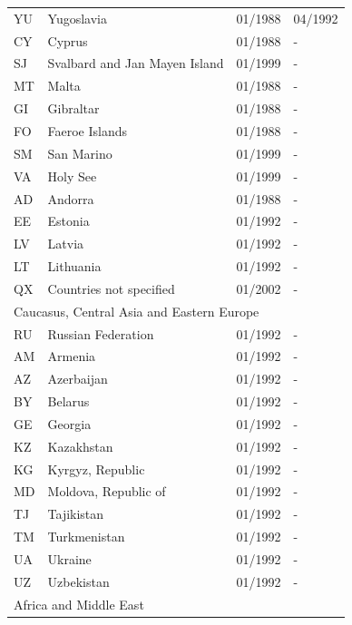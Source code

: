 \begin{footnotesize}
\begin{longtable}{lp{8cm}p{2cm}p{2cm}}
	YU   &   Yugoslavia                       &   01/1988   &   04/1992  \\
	CY   &   Cyprus                           &   01/1988   &   -  \\
	SJ   &   Svalbard and Jan Mayen Island    &   01/1999   &   -  \\
	MT   &   Malta                            &   01/1988   &   -  \\
	GI   &   Gibraltar                        &   01/1988   &   -  \\
	FO   &   Faeroe Islands                   &   01/1988   &   -  \\
	SM   &   San Marino                       &   01/1999   &   -  \\
	VA   &   Holy See                         &   01/1999   &   -  \\
	AD   &   Andorra                          &   01/1988   &   -  \\
	EE   &   Estonia                          &   01/1992   &   -  \\
	LV   &   Latvia                           &   01/1992   &   -  \\
	LT   &   Lithuania                        &   01/1992   &   -  \\
	QX   &   Countries not specified          &   01/2002   &   -  \\
  \midrule
  \multicolumn{3}{l}{Caucasus, Central Asia and Eastern Europe}  &  \\
	RU & Russian Federation   & 01/1992 & -  \\
	AM & Armenia              & 01/1992 & -  \\
	AZ & Azerbaijan           & 01/1992 & -  \\
	BY & Belarus              & 01/1992 & -  \\
	GE & Georgia              & 01/1992 & -  \\
	KZ & Kazakhstan           & 01/1992 & -  \\
	KG & Kyrgyz, Republic     & 01/1992 & -  \\
	MD & Moldova, Republic of & 01/1992 & -  \\
	TJ & Tajikistan           & 01/1992 & -  \\
	TM & Turkmenistan         & 01/1992 & -  \\
	UA & Ukraine              & 01/1992 & -  \\
	UZ & Uzbekistan           & 01/1992 & -  \\
	\midrule
	\multicolumn{3}{l}{Africa and Middle East}  &  \\

\end{longtable}
\end{footnotesize}
